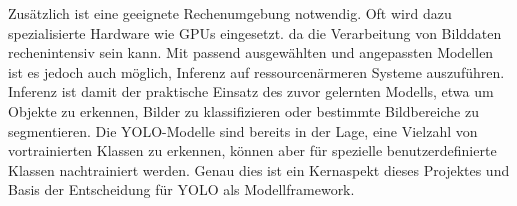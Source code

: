 Zusätzlich ist eine geeignete Rechenumgebung notwendig. Oft wird dazu spezialisierte Hardware wie GPUs eingesetzt. da die Verarbeitung von Bilddaten rechenintensiv sein kann.
Mit passend ausgewählten und angepassten Modellen ist es jedoch auch möglich, Inferenz auf ressourcenärmeren Systeme auszuführen.
Inferenz ist damit der praktische Einsatz des zuvor gelernten Modells, etwa um Objekte zu erkennen, Bilder zu klassifizieren oder bestimmte Bildbereiche zu segmentieren.
\newPar
Die YOLO-Modelle sind bereits in der Lage, eine Vielzahl von vortrainierten Klassen zu erkennen, können aber für spezielle benutzerdefinierte Klassen nachtrainiert werden.
Genau dies ist ein Kernaspekt dieses Projektes und Basis der Entscheidung für YOLO als Modellframework.
\cite{yolo_docu}
